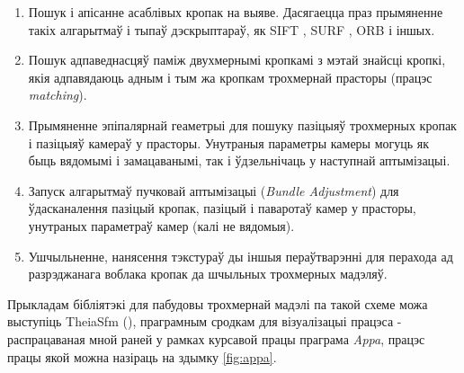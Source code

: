 \begin{enumerate}
  \item Пошук і апісанне асаблівых кропак на выяве. Дасягаецца праз прымяненне
  такіх алгарытмаў і тыпаў дэскрыптараў, як SIFT \cite{sift-paper},
  SURF \cite{surf-paper}, ORB \cite{orb-paper} і іншых.
  \item Пошук адпаведнасцяў паміж двухмернымі кропкамі з мэтай знайсці
  кропкі, якія адпавядаюць адным і тым жа кропкам трохмернай прасторы (працэс \textit{matching}).
  \item Прымяненне эпіпалярнай геаметрыі для пошуку пазіцыяў трохмерных кропак
  і пазіцыяў камераў у прасторы. Унутраныя параметры камеры могуць як быць вядомымі
  і замацаванымі, так і ўдзельнічаць у наступнай аптымізацыі.
  \item Запуск алгарытмаў пучковай аптымізацыі (\textit{Bundle Adjustment}) для
  ўдасканалення пазіцый кропак, пазіцый і паваротаў камер у прасторы, унутраных
  параметраў камер (калі не вядомыя).
  \item Ушчыльненне, нанясення тэкстураў ды іншыя пераўтварэнні для перахода ад
  разрэджанага воблака кропак да шчыльных трохмерных мадэляў.
\end{enumerate}

Прыкладам бібліятэкі для пабудовы трохмернай мадэлі па такой схеме можа выступіць TheiaSfm
(\cite{theia-sfm}), праграмным сродкам для візуалізацыі працэса - распрацаваная мной
раней у рамках курсавой працы праграма \textit{Appa}, працэс працы якой можна
назіраць на здымку \ref{fig:appa}.

\newpage
